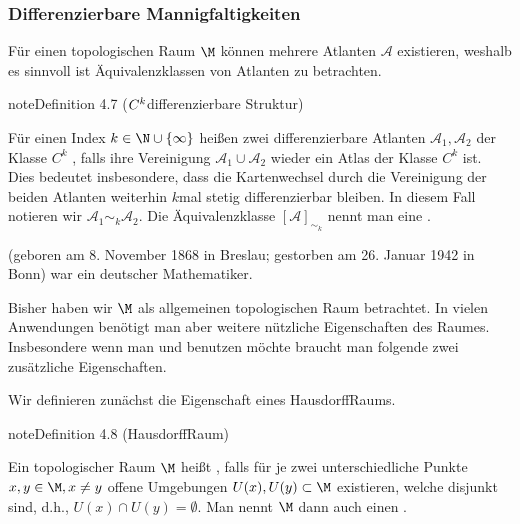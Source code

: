 \documentclass[letterpaper,10pt,german]{jupyterBook}
\begin{document}
\subsubsection{Differenzierbare Mannigfaltigkeiten}
\label{\detokenize{manifolds/manifolds_prelim:differenzierbare-mannigfaltigkeiten}}
\sphinxAtStartPar
Für einen topologischen Raum \(\M\) können mehrere Atlanten \(\mathcal{A}\) existieren, weshalb es sinnvoll ist Äquivalenzklassen von Atlanten zu betrachten.
\label{manifolds/manifolds_prelim:definition-9}
\begin{sphinxadmonition}{note}{Definition 4.7 (\protect\(C^k\protect\)\sphinxhyphen{}differenzierbare Struktur)}



\sphinxAtStartPar
Für einen Index \(k\in \N \cup \{\infty\}\) heißen zwei differenzierbare Atlanten \(\mathcal{A}_1, \mathcal{A}_2\) der Klasse \(C^k\) , falls ihre Vereinigung \(\mathcal{A}_1\cup \mathcal{A}_2\) wieder ein Atlas der Klasse \(C^k\) ist.
Dies bedeutet insbesondere, dass die Kartenwechsel durch die Vereinigung der beiden Atlanten weiterhin \(k\)\sphinxhyphen{}mal stetig differenzierbar bleiben.
In diesem Fall notieren wir \(\mathcal{A}_1\sim_k \mathcal{A}_2\).
Die Äquivalenzklasse \([\mathcal{A}]_{\sim_k}\) nennt man eine .
\end{sphinxadmonition}

\begin{sphinxShadowBox}
\sphinxstylesidebartitle{}

\sphinxAtStartPar
{} (geboren am 8. November 1868 in Breslau; gestorben am 26. Januar 1942 in Bonn) war ein deutscher Mathematiker.
\end{sphinxShadowBox}

\sphinxAtStartPar
Bisher haben wir \(\M\) als allgemeinen topologischen Raum betrachtet.
In vielen Anwendungen benötigt man aber weitere nützliche Eigenschaften des Raumes.
Insbesondere wenn man  und  benutzen möchte braucht man folgende zwei zusätzliche Eigenschaften.

\sphinxAtStartPar
Wir definieren zunächst die Eigenschaft eines Hausdorff\sphinxhyphen{}Raums.
\label{manifolds/manifolds_prelim:def:hausdorffraum}
\begin{sphinxadmonition}{note}{Definition 4.8 (Hausdorff\sphinxhyphen{}Raum)}



\sphinxAtStartPar
Ein topologischer Raum \(\M\) heißt , falls für je zwei unterschiedliche Punkte \(x,y\in \M, x\neq y\) offene Umgebungen \(U(x), U(y) \subset \M\) existieren, welche disjunkt sind, d.h., \(U(x)\cap U(y) = \emptyset\).
Man nennt \(\M\) dann auch einen .
\end{sphinxadmonition}
\end{document}
